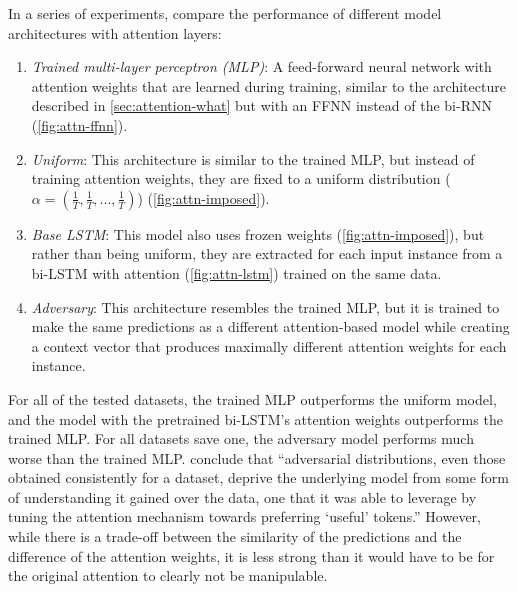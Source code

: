 In a series of experiments, \citeauthor{wiegreffe2019attentionNotNot} compare the performance of different model architectures with attention layers:
\begin{enumerate}
    \item \textit{Trained multi-layer perceptron (MLP)}: A feed-forward neural network with attention weights that are learned during training, similar to the architecture described in \autoref{sec:attention-what} but with an FFNN instead of the bi-RNN (\autoref{fig:attn-ffnn}).
    \item \textit{Uniform}: This architecture is similar to the trained MLP, but instead of training attention weights, they are fixed to a uniform distribution ($\alpha = (\frac{1}{T}, \frac{1}{T}, ..., \frac{1}{T})$) (\autoref{fig:attn-imposed}).
    \item \textit{Base LSTM}: This model also uses frozen weights (\autoref{fig:attn-imposed}), but rather than being uniform, they are extracted for each input instance from a bi-LSTM with attention (\autoref{fig:attn-lstm}) trained on the same data.
    \item \textit{Adversary}: This architecture resembles the trained MLP, but it is trained to make the same predictions as a different attention-based model while creating a context vector that produces maximally different attention weights for each instance. 
\end{enumerate}

For all of the tested datasets, the trained MLP outperforms the uniform model, and the model with the pretrained bi-LSTM's attention weights outperforms the trained MLP.
For all datasets save one, the adversary model performs much worse than the trained MLP.
\citeauthor{wiegreffe2019attentionNotNot} conclude that ``adversarial distributions,
even those obtained consistently for a
dataset, deprive the underlying model from some
form of understanding it gained over the data, one
that it was able to leverage by tuning the attention
mechanism towards preferring `useful' tokens.''
However, while there is a trade-off between the similarity of the predictions and the difference of the attention weights, it is less strong than it would have to be for the original attention to clearly not be manipulable.



